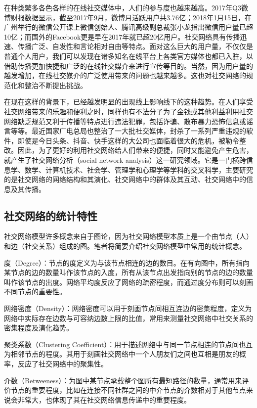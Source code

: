 在种类繁多各色各样的在线社交媒体中，人们的参与度也越来越高。2017年Q3微博财报数据显示，截至2017年9月，微博月活跃用户共3.76亿；2018年1月15日，在广州举行的微信公开课上微信创始人、腾讯高级副总裁张小龙指出微信用户量已超10亿；而国外的Facebook更是早在2017年就已超20亿用户。社交网络具有传播迅速、传播广泛、自发性和言论相对自由等特点。面对这么巨大的用户量，不仅仅是普通个人用户，我们可以发现在诸多知名在线平台上各类官方媒体也都已入驻，以借助传播更加快捷和广泛的在线社交媒介来进行宣传等目的。当然，因为用户量的越发增加，在线社交媒介的广泛使用带来的问题也越来越多。这也对社交网络的规范化和整治不断提出挑战。

在现在这样的背景下，已经越发明显的出现线上影响线下的这种趋势。在人们享受社交网络带来的乐趣和便利之时，同样也有不法分子为了金钱或其他利益利用社交网络缺乏规范又利于传播等特点进行违法犯罪，包括诈骗、散布暴力恐怖信息或谣言等等。最近国家广电总局也整治了一大批社交媒体，封杀了一系列严重违规的软件，即使是今日头条、抖音、快手这样的大公司也面临着很大的危机，被勒令整改。因此，为了更好的利用社交网络给人们带来的便捷，同时又能避免产生危害，就产生了社交网络分析（social network analysis）这一研究领域。它是一门横跨信息学、数学、计算机技术、社会学、管理学和心理学等学科的交叉科学，主要研究的是社交网络的网络结构和其演化、社交网络中的群体及其互动、社交网络中的信息及其传播。

\subsection{社交网络的统计特性}

社交网络模型许多概念来自于图论，因为社交网络模型本质上是一个由节点（人）和边（社交关系）组成的图。笔者将简要介绍社交网络模型中常用的统计概念。

度（Degree）：节点的度定义为与该节点相连的边的数目。在有向图中，所有指向某节点的边的数量叫作该节点的入度，所有从该节点出发指向别的节点的边的数量叫作该节点的出度。网络平均度反应了网络的疏密程度，而通过度分布则可以刻画不同节点的重要性。

网络密度（Density）：网络密度可以用于刻画节点间相互连边的密集程度，定义为网络中实际存在边数与可容纳边数上限的比值，常用来测量社交网络中社交关系的密集程度及演化趋势。

聚类系数（Clustering Coefficient）：用于描述网络中与同一节点相连的节点间也互为相邻节点的程度。其用于刻画社交网络中一个人朋友们之间也互相是朋友的概率，反应了社交网络中的聚集性。

介数（Betweeness）：为图中某节点承载整个图所有最短路径的数量，通常用来评价节点的重要程度，比如在连接不同社群之间的中介节点的介数相对于其他节点来说会非常大，也体现了其在社交网络信息传递中的重要程度。

